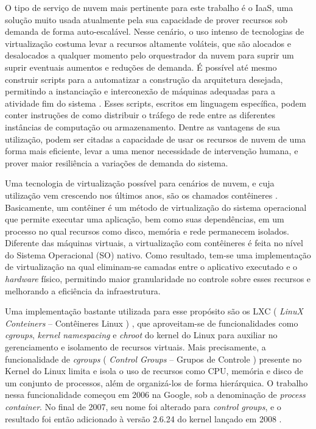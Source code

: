 O tipo de serviço de nuvem mais pertinente para este trabalho é o IaaS, uma solução muito usada atualmente pela sua capacidade de prover recursos sob demanda de forma auto-escalável.
%
Nesse cenário, o uso intenso de tecnologias de virtualização costuma levar a recursos altamente voláteis, que são alocados e desalocados a qualquer momento pelo orquestrador da nuvem para suprir um suprir eventuais aumentos e reduções de demanda.
%
É possível até mesmo construir scripts para a automatizar a construção da arquitetura desejada, permitindo a instanciação e interconexão de máquinas adequadas para a atividade fim do sistema .
%
Esses scripts, escritos em linguagem específica, podem conter instruções de como distribuir o tráfego de rede entre as diferentes instâncias de computação ou armazenamento.
%
Dentre as vantagens de sua utilização, podem ser citadas a capacidade de usar os recursos de nuvem de uma forma mais eficiente, levar a uma menor necessidade de intervenção humana, e prover maior resiliência a variações de demanda do sistema.



Uma tecnologia de virtualização possível para cenários de nuvem, e cuja utilização vem crescendo nos últimos anos, são os chamados contêineres \cite{containers-tech:2014}. 
%
Basicamente, um contêiner é um método de virtualização do sistema operacional que permite executar uma aplicação, bem como suas dependências, em um processo no qual recursos como disco, memória e rede permanecem isolados.
%
Diferente das máquinas virtuais, a virtualização com contêineres é feita no nível do Sistema Operacional (SO) nativo.
%
Como resultado, tem-se uma implementação de virtualização na qual eliminam-se camadas entre o aplicativo executado e o \textit{hardware} físico, permitindo maior granularidade no controle sobre esses recursos e melhorando a eficiência da infraestrutura.


Uma implementação bastante utilizada para esse propósito são os LXC ( \textit{LinuX Conteiners} -- Contêineres Linux ) \cite{Linuxcontainers.org2015}, que aproveitam-se de funcionalidades como \textit{cgroups}, \textit{kernel namespacing} e \textit{chroot} do kernel do Linux para auxiliar no gerenciamento e isolamento de recursos virtuais.
%
Mais precisamente, a funcionalidade de \textit{cgroups} ( \textit{Control Groups} -- Grupos de Controle ) presente no Kernel do Linux limita e isola o uso de recursos como CPU, memória e disco de um conjunto de processos, além de organizá-los de forma hierárquica. 
%
O trabalho nessa funcionalidade começou em 2006 na Google, sob a denominação de \textit{process container}. 
%
No final de 2007, seu nome foi alterado para \textit{control groups}, e o resultado foi então adicionado à versão 2.6.24 do kernel lançado em 2008 \cite{UnixManPagesControlGroups}.

